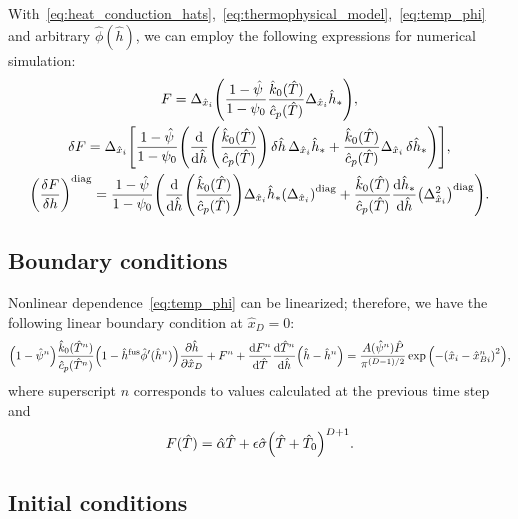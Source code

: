 \documentclass{article}
\newcommand{\dder}[2][]{\Delta_{#2}#1}
\newcommand{\diag}[1]{\qty(#1)^\mathrm{diag}}
\newcommand{\fusion}[1]{{#1}^\mathrm{fus}}
\newcommand{\Hx}{\hat{x}}
\newcommand{\Hh}{\hat{h}}
\newcommand{\HT}{\hat{T}}
\newcommand{\HP}{\hat{P}}
\newcommand{\Halpha}{\hat{\alpha}}
\newcommand{\Hsigma}{\hat{\sigma}}
\newcommand{\Hc}{\hat{c}}
\newcommand{\Hk}{\hat{k}}
\newcommand{\Hphi}{\hat{\phi}}
\newcommand{\Hpsi}{\hat{\psi}}
\begin{document}
With~\eqref{eq:heat_conduction_hats},~\eqref{eq:thermophysical_model},~\eqref{eq:temp_phi}
and arbitrary \(\Hphi(\Hh)\), we can employ the following expressions for numerical simulation:
\begin{gather}
    F = \dder{\Hx_i}\qty(
        \frac{1 - \Hpsi}{1 - \psi_0} \frac{\Hk_0(\HT)}{\Hc_p(\HT)} \dder[\Hh_*]{\Hx_i}
	), \\
    \var{F} = \dder{\Hx_i}\qty[ \frac{1 - \Hpsi}{1 - \psi_0} \qty(
	    \dv{\Hh}(\frac{\Hk_0(\HT)}{\Hc_p(\HT)})\var{\Hh}\dder[\Hh_*]{\Hx_i} +
	    \frac{\Hk_0(\HT)}{\Hc_p(\HT)} \dder[\var{\Hh_*}]{\Hx_i}
	)], \\
    \diag{\fdv{F}{h}} = \frac{1 - \Hpsi}{1 - \psi_0} \qty(
	    \dv{\Hh}(\frac{\Hk_0(\HT)}{\Hc_p(\HT)})\dder[\Hh_*]{\Hx_i} \diag{\dder{\Hx_i}} +
	    \frac{\Hk_0(\HT)}{\Hc_p(\HT)}\dv{\Hh_*}{\Hh} \diag{\dder{\Hx_i}^2}
	).
\end{gather}

\subsection{Boundary conditions}

Nonlinear dependence~\eqref{eq:temp_phi} can be linearized; therefore, we have the following linear boundary condition at \(\Hx_D=0\):
\begin{equation}\label{eq:bc_linearized}
    \qty(1 - \Hpsi^n) \frac{\Hk_0(\HT^n)}{\Hc_p(\HT^n)} \qty(1-\fusion{\Hh}\hat\phi'(\Hh^n))\pdv{\Hh}{\Hx_D} +
	    F^n + \dv{F^n}{\HT}\dv{\HT^n}{\Hh}\qty(\Hh - \Hh^n) =
	    \frac{A(\Hpsi^n)\HP}{\pi^{(D-1)/2}}\exp\qty( -\qty(\Hx_i-\Hx_{Bi}^n)^2 ),
\end{equation}
where superscript \(n\) corresponds to values calculated at the previous time step and
\begin{equation}\label{eq:bc_Dirichlet_part}
    F(\HT) = \Halpha\HT + \epsilon\Hsigma\qty(\HT + \HT_0)^{D+1}.
\end{equation}

\subsection{Initial conditions}
\end{document}
